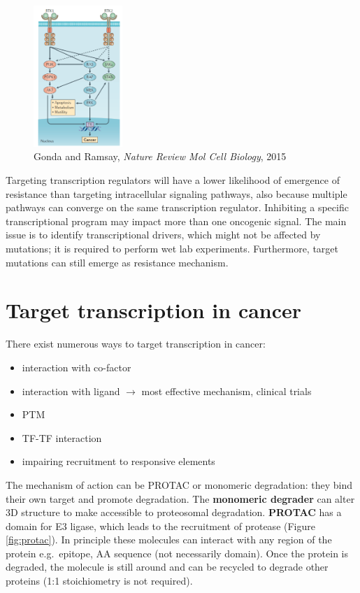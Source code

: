 \begin{figure}
\centering
\includegraphics[width=0.3\textwidth]{../_resources/Screen_Shot_2022-11-04_at_11-51-12.png}
\caption{Gonda and Ramsay, \emph{Nature Review Mol Cell Biology}, 2015}
\end{figure}

Targeting transcription regulators will have a lower likelihood of emergence of resistance than targeting intracellular signaling pathways, also because multiple pathways can converge on the same transcription regulator. Inhibiting a specific transcriptional program may impact more than one oncogenic signal. The main issue is to identify transcriptional drivers, which might not be affected by mutations; it is required to perform wet lab experiments. Furthermore, target mutations can still emerge as resistance mechanism.

\hypertarget{target-transcription-in-cancer}{%
\section{Target transcription in cancer}\label{target-transcription-in-cancer}}

There exist numerous ways to target transcription in cancer:

\begin{itemize}
\tightlist
\item
  interaction with co-factor
\item
  interaction with ligand $\rightarrow$ most effective mechanism, clinical trials
\item
  PTM
\item
  TF-TF interaction
\item
  impairing recruitment to responsive elements
\end{itemize}

The mechanism of action can be PROTAC or monomeric degradation: they bind their own target and promote degradation. The \textbf{monomeric degrader} can alter 3D structure to make accessible to proteosomal degradation. \textbf{PROTAC} has a domain for E3 ligase, which leads to the recruitment of protease (Figure \ref{fig:protac}). In principle these molecules can interact with any region of the protein e.g.~epitope, AA sequence (not necessarily domain). Once the protein is degraded, the molecule is still around and can be recycled to degrade other proteins (1:1 stoichiometry is not required).

